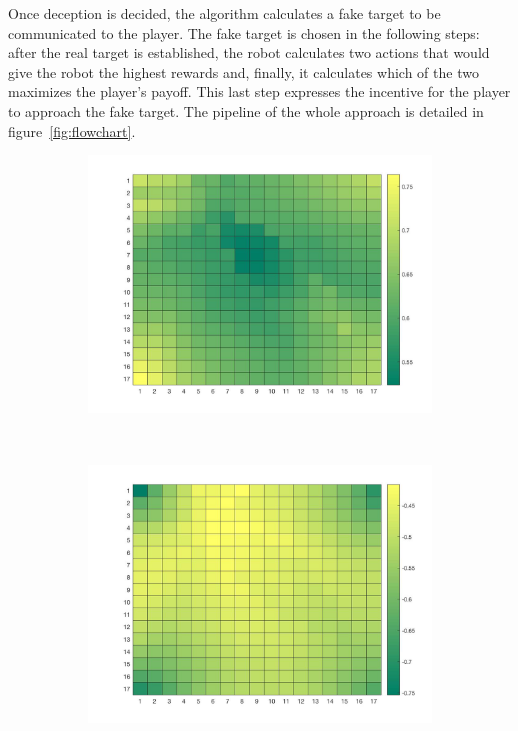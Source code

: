 Once deception is decided, the algorithm calculates a fake target to be communicated to the player. The fake target is chosen in the following steps: after the real target is established, the robot calculates two actions that would give the robot the highest rewards and, finally, it calculates which of the two maximizes the player's payoff. This last step expresses the incentive for the player to approach the fake target. The pipeline of the whole approach is detailed in figure~\ref{fig:flowchart}.

\begin{figure}[H]
    \centering
    \begin{subfigure}[t]{0.49\columnwidth}
        \centering
        \includegraphics[width=\linewidth]{images/06-deception/interdependence.jpg}
        \caption{}
        \label{fig:interdipendence}
    \end{subfigure}
    ~
    \begin{subfigure}[t]{0.49\columnwidth}
        \centering
        \includegraphics[width=\linewidth]{images/06-deception/correspondence.jpg}

\end{subfigure}
\end{figure}
